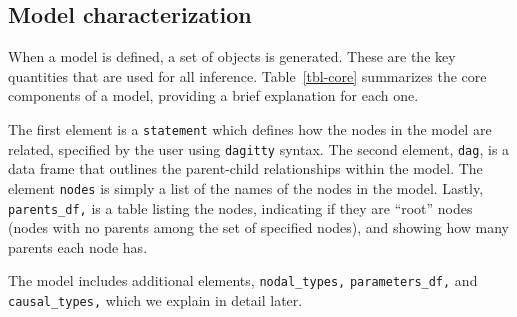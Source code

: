 \documentclass[
  11pt,
  article]{jss}
\begin{document}
\hypertarget{model-characterization}{%
\subsection{Model characterization}\label{model-characterization}}

When a model is defined, a set of objects is generated. These are the
key quantities that are used for all inference. Table~\ref{tbl-core}
summarizes the core components of a model, providing a brief explanation
for each one.

The first element is a \texttt{statement} which defines how the nodes in
the model are related, specified by the user using \texttt{dagitty}
syntax. The second element, \texttt{dag}, is a data frame that outlines
the parent-child relationships within the model. The element
\texttt{nodes} is simply a list of the names of the nodes in the model.
Lastly, \texttt{parents\_df,} is a table listing the nodes, indicating
if they are ``root'' nodes (nodes with no parents among the set of
specified nodes), and showing how many parents each node has.

The model includes additional elements, \texttt{nodal\_types,}
\texttt{parameters\_df,} and \texttt{causal\_types,} which we explain in
detail later.
\end{document}
